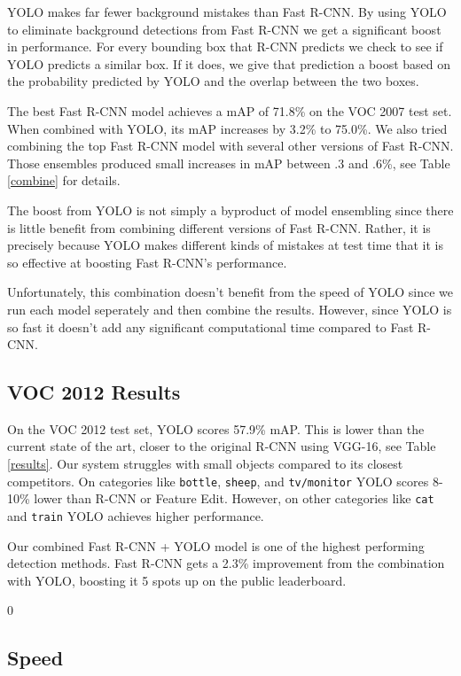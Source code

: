 YOLO makes far fewer background mistakes than Fast R-CNN. By using YOLO to eliminate background detections from Fast R-CNN we get a significant boost in performance. For every bounding box that R-CNN predicts we check to see if YOLO predicts a similar box. If it does, we give that prediction a boost based on the probability predicted by YOLO and the overlap between the two boxes.

The best Fast R-CNN model achieves a mAP of 71.8\% on the VOC 2007 test set. When combined with YOLO, its mAP increases by 3.2\% to 75.0\%. We also tried combining the top Fast R-CNN model with several other versions of Fast R-CNN. Those ensembles produced small increases in mAP between .3 and .6\%, see Table \ref{combine} for details.

The boost from YOLO is not simply a byproduct of model ensembling since there is little benefit from combining different versions of Fast R-CNN. Rather, it is precisely because YOLO makes different kinds of mistakes at test time that it is so effective at boosting Fast R-CNN's performance.

Unfortunately, this combination doesn't benefit from the speed of YOLO since we run each model seperately and then combine the results. However, since YOLO is so fast it doesn't add any significant computational time compared to Fast R-CNN.

\subsection{VOC 2012 Results}

On the VOC 2012 test set, YOLO scores 57.9\% mAP. This is lower than the current state of the art, closer to the original R-CNN using VGG-16, see Table \ref{results}. Our system struggles with small objects compared to its closest competitors. On categories like \texttt{bottle}, \texttt{sheep}, and \texttt{tv/monitor} YOLO scores 8-10\% lower than R-CNN or Feature Edit. However, on other categories like \texttt{cat} and \texttt{train} YOLO achieves higher performance.

Our combined Fast R-CNN + YOLO model is one of the highest performing detection methods. Fast R-CNN gets a 2.3\% improvement from the combination with YOLO, boosting it 5 spots up on the public leaderboard.

 0
\subsection{Speed}

